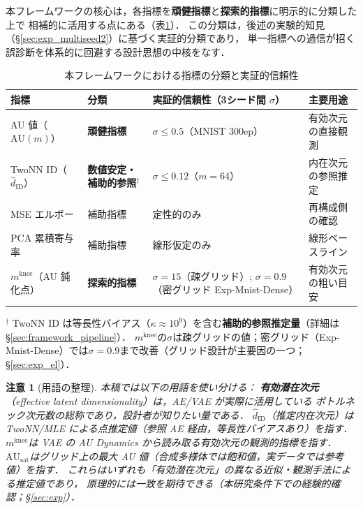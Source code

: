 \documentclass[11pt,a4paper]{jsarticle}
\newtheorem{remark}{注意}
\newcommand{\kap}{\kappa}
\newcommand{\AUsat}{\mathrm{AU}_{\mathrm{sat}}}
\newcommand{\mknee}{m^{\mathrm{knee}}}
\begin{document}
本フレームワークの核心は，各指標を\textbf{頑健指標}と\textbf{探索的指標}に明示的に分類した上で
相補的に活用する点にある（表\ref{tab:indicator_class}）．
この分類は，後述の実験的知見（§\ref{sec:exp_multiseed2}）に基づく実証的分類であり，
単一指標への過信が招く誤診断を体系的に回避する設計思想の中核をなす．

\begin{table}[H]
\centering
\caption{本フレームワークにおける指標の分類と実証的信頼性}
\label{tab:indicator_class}
\small
\begin{tabular}{llll}
\toprule
指標 & 分類 & 実証的信頼性（3シード間 $\sigma$） & 主要用途 \\
\midrule
AU 値（$\mathrm{AU}(m)$） & \textbf{頑健指標} & $\sigma \leq 0.5$（MNIST 300ep） & 有効次元の直接観測 \\
TwoNN ID（$\hat{d}_\mathrm{ID}$） & \textbf{数値安定・補助的参照}$^\dagger$ & $\sigma \leq 0.12$（$m=64$） & 内在次元の参照推定 \\
MSE エルボー & 補助指標 & 定性的のみ & 再構成側の確認 \\
PCA 累積寄与率 & 補助指標 & 線形仮定のみ & 線形ベースライン \\
$\mknee$（AU 鈍化点） & \textbf{探索的指標} & $\sigma = 15$（疎グリッド）; $\sigma = 0.9$（密グリッド Exp-Mnist-Dense） & 有効次元の粗い目安 \\
\bottomrule
\end{tabular}
\medskip
\footnotesize
$^\dagger$ TwoNN ID は等長性バイアス（$\kap \approx 10^9$）を含む\textbf{補助的参照推定量}（詳細は§\ref{sec:framework_pipeline}）．
$\mknee$の$\sigma$は疎グリッドの値；密グリッド（Exp-Mnist-Dense）では$\sigma=0.9$まで改善（グリッド設計が主要因の一つ；§\ref{sec:exp_el}）．
\normalsize
\end{table}

\begin{remark}[用語の整理]
本稿では以下の用語を使い分ける：
\textbf{有効潜在次元}（effective latent dimensionality）は，AE/VAE が実際に活用している
ボトルネック次元数の総称であり，設計者が知りたい量である．
\textbf{$\hat{d}_\mathrm{ID}$}（推定内在次元）は TwoNN/MLE による点推定値（参照 AE 経由，等長性バイアスあり）を指す．
\textbf{$\mknee$}は VAE の AU Dynamics から読み取る有効次元の観測的指標を指す．
\textbf{$\AUsat$}はグリッド上の最大 AU 値（合成多様体では飽和値，実データでは参考値）を指す．
これらはいずれも「有効潜在次元」の異なる近似・観測手法による推定値であり，
原理的には一致を期待できる（本研究条件下での経験的確認；§\ref{sec:exp}）．
\end{remark}
\end{document}
